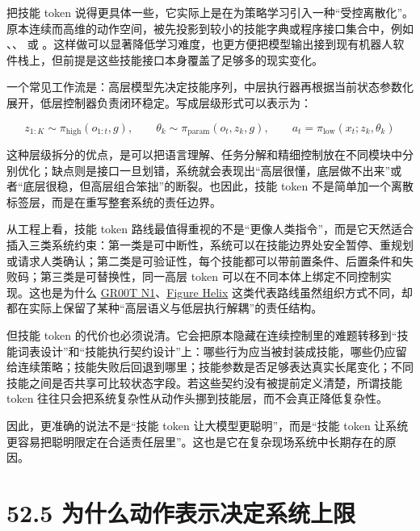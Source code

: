 把技能 token 说得更具体一些，它实际上是在为策略学习引入一种“受控离散化”。原本连续而高维的动作空间，被先投影到较小的技能字典或程序接口集合中，例如 \texttt{}、\texttt{}、\texttt{} 或 \texttt{}。这样做可以显著降低学习难度，也更方便把模型输出接到现有机器人软件栈上，但前提是这些技能接口本身覆盖了足够多的现实变化。

一个常见工作流是：高层模型先决定技能序列，中层执行器再根据当前状态参数化展开，低层控制器负责闭环稳定。写成层级形式可以表示为：

\begingroup
\scriptsize
\begin{equation*}
z_{1:K} \sim \pi_{\text{high}}(o_{1:t}, g), \qquad
\theta_k \sim \pi_{\text{param}}(o_t, z_k, g), \qquad
a_t = \pi_{\text{low}}(x_t; z_k, \theta_k)
\end{equation*}
\endgroup

这种层级拆分的优点，是可以把语言理解、任务分解和精细控制放在不同模块中分别优化；缺点则是接口一旦划错，系统就会表现出“高层很懂，底层做不出来”或者“底层很稳，但高层组合笨拙”的断裂。也因此，技能 token 不是简单加一个离散标签层，而是在重写整套系统的责任边界。

从工程上看，技能 token 路线最值得重视的不是“更像人类指令”，而是它天然适合插入三类系统约束：第一类是可中断性，系统可以在技能边界处安全暂停、重规划或请求人类确认；第二类是可验证性，每个技能都可以带前置条件、后置条件和失败码；第三类是可替换性，同一高层 token 可以在不同本体上绑定不同控制实现。这也是为什么 \href{https://arxiv.org/abs/2503.14734}{GR00T N1}、\href{https://www.figure.ai/news/helix}{Figure Helix} 这类代表路线虽然组织方式不同，却都在实际上保留了某种“高层语义与低层执行解耦”的责任结构。

但技能 token 的代价也必须说清。它会把原本隐藏在连续控制里的难题转移到“技能词表设计”和“技能执行契约设计”上：哪些行为应当被封装成技能，哪些仍应留给连续策略；技能失败后回退到哪里；技能参数是否足够表达真实长尾变化；不同技能之间是否共享可比较状态字段。若这些契约没有被提前定义清楚，所谓技能 token 往往只会把系统复杂性从动作头挪到技能层，而不会真正降低复杂性。

因此，更准确的说法不是“技能 token 让大模型更聪明”，而是“技能 token 让系统更容易把聪明限定在合适责任层里”。这也是它在复杂现场系统中长期存在的原因。

\section*{52.5 为什么动作表示决定系统上限}


